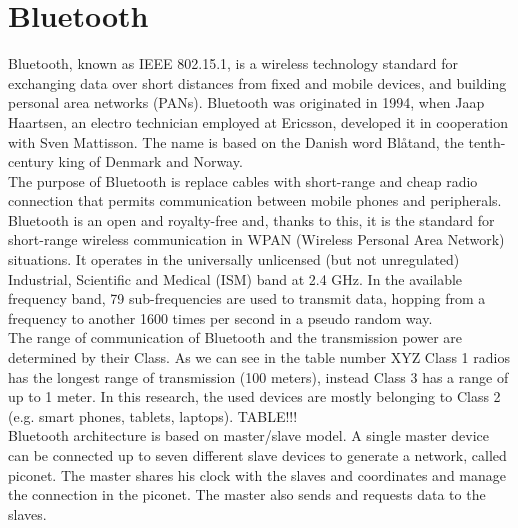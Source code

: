 \section{Bluetooth}
Bluetooth, known as IEEE 802.15.1, is a wireless technology standard for exchanging data over short distances from fixed and mobile devices, and building personal area networks (PANs).
Bluetooth was originated in 1994, when Jaap Haartsen, an electro technician employed at Ericsson, developed it in cooperation with Sven Mattisson. The name is based on the Danish word Bl\r{a}tand, the tenth-century king of Denmark and Norway. \\
The purpose of Bluetooth is replace cables with short-range and cheap radio connection that permits communication between mobile phones and peripherals.\\
Bluetooth is an open and royalty-free and, thanks to this, it is the standard for short-range wireless communication in WPAN (Wireless Personal Area Network) situations.
It operates in the universally unlicensed (but not unregulated) Industrial, Scientific and Medical (ISM) band at 2.4 GHz.
In the available frequency band, 79 sub-frequencies are used to transmit data, hopping from a frequency to another 1600 times per second in a pseudo random way.\\
\linebreak
The range of communication of Bluetooth and the transmission power are determined by their Class. As we can see in the table number XYZ Class 1 radios has the longest range of transmission (100 meters), instead Class 3 has a range of up to 1 meter. 
In this research, the used devices are mostly belonging to Class 2 (e.g. smart phones, tablets, laptops).
TABLE!!!
\\
Bluetooth architecture is based on master/slave model. A single master device can be connected up to seven different slave devices to generate a network, called piconet. The master shares his clock with the slaves and coordinates and manage the connection in the piconet. The master also sends and requests data to the slaves.

